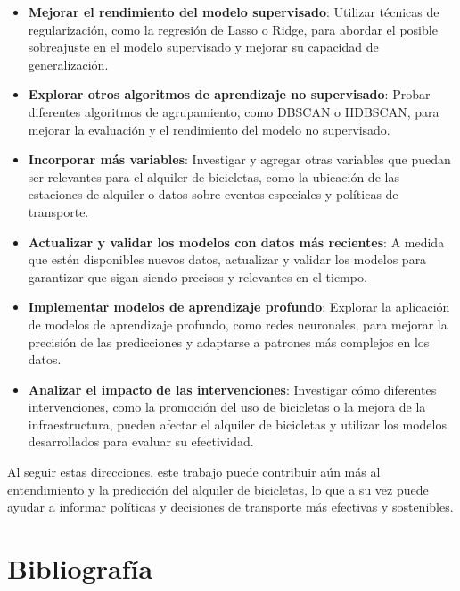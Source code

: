 \documentclass{wsdcr}
\begin{document}
\begin{itemize}
    \item \textbf{Mejorar el rendimiento del modelo supervisado}: Utilizar técnicas de regularización, como la regresión de Lasso o Ridge, para abordar el posible sobreajuste en el modelo supervisado y mejorar su capacidad de generalización.
    \item \textbf{Explorar otros algoritmos de aprendizaje no supervisado}: Probar diferentes algoritmos de agrupamiento, como DBSCAN o HDBSCAN, para mejorar la evaluación y el rendimiento del modelo no supervisado.
    \item \textbf{Incorporar más variables}: Investigar y agregar otras variables que puedan ser relevantes para el alquiler de bicicletas, como la ubicación de las estaciones de alquiler o datos sobre eventos especiales y políticas de transporte.
    \item \textbf{Actualizar y validar los modelos con datos más recientes}: A medida que estén disponibles nuevos datos, actualizar y validar los modelos para garantizar que sigan siendo precisos y relevantes en el tiempo.
    \item \textbf{Implementar modelos de aprendizaje profundo}: Explorar la aplicación de modelos de aprendizaje profundo, como redes neuronales, para mejorar la precisión de las predicciones y adaptarse a patrones más complejos en los datos.
    \item \textbf{Analizar el impacto de las intervenciones}: Investigar cómo diferentes intervenciones, como la promoción del uso de bicicletas o la mejora de la infraestructura, pueden afectar el alquiler de bicicletas y utilizar los modelos desarrollados para evaluar su efectividad.

\end{itemize}

Al seguir estas direcciones, este trabajo puede contribuir aún más al entendimiento y la predicción del alquiler de bicicletas, lo que a su vez puede ayudar a informar políticas y decisiones de transporte más efectivas y sostenibles.



\section*{Bibliografía}
\end{document}

